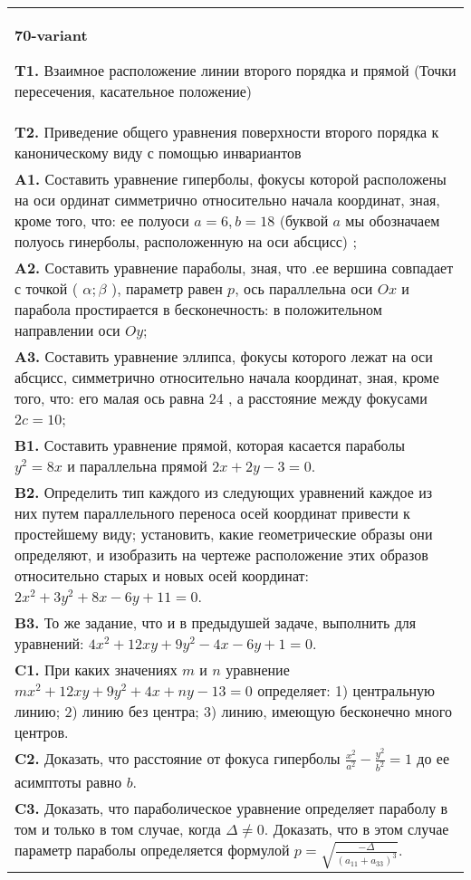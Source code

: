 \documentclass{article}
\begin{document}
\begin{tabular}{m{17cm}}
\textbf{70-variant}
\newline

\textbf{T1.} Взаимное расположение линии второго порядка и прямой (Точки пересечения, касательное положение) \\
\textbf{T2.} Приведение общего уравнения поверхности второго порядка к каноническому виду с помощью инвариантов \\
\textbf{A1.} Составить уравнение гиперболы, фокусы которой расположены на оси ординат симметрично относительно начала координат, зная, кроме того, что: ее полуоси $a=6, b=18$ (буквой $a$ мы обозначаем полуось гинерболы, расположенную на оси абсцисс) ; \\
\textbf{A2.} Составить уравнение параболы, зная, что .ее вершина совпадает с точкой ( $\alpha ; \beta$ ), параметр равен $p$, ось параллельна оси $O x$ и парабола простирается в бесконечность: в положительном направлении оси $O y$; \\
\textbf{A3.} Составить уравнение эллипса, фокусы которого лежат на оси абсцисс, симметрично относительно начала координат, зная, кроме того, что: его малая ось равна 24 , а расстояние между фокусами $2 c=10$; \\
\textbf{B1.} Составить уравнение прямой, которая касается параболы $y^2=8 x$ и параллельна прямой $2 x+2 y-3=0$. \\
\textbf{B2.} Определить тип каждого из следующих уравнений каждое из них путем параллельного переноса осей координат привести к простейшему виду; установить, какие геометрические образы они определяют, и изобразить на чертеже расположение этих образов относительно старых и новых осей координат: $2 x^2+3 y^2+8 x-6 y+11=0$. \\
\textbf{B3.} То же задание, что и в предыдушей задаче, выполнить для уравнений: $4 x^2+12 x y+9 y^2-4 x-6 y+1=0$. \\
\textbf{C1.} При каких значениях $m$ и $n$ уравнение $m x^2+12 x y+9 y^2+4 x+n y-13=0$ определяет: 1) центральную линию; 2) линию без центра; 3) линию, имеющую бесконечно много центров. \\
\textbf{C2.} Доказать, что расстояние от фокуса гиперболы $\frac{x^2}{a^2}-\frac{y^2}{b^2}=1$ до ее асимптоты равно $b$. \\
\textbf{C3.} Доказать, что параболическое уравнение определяет параболу в том и только в том случае, когда $\Delta \neq 0$. Доказать, что в этом случае параметр параболы определяется формулой $p=\sqrt{\frac{-\Delta}{ (a_{11}+a_{33}) ^3}}$. \\

\end{tabular}
\vspace{1cm}
\end{document}

